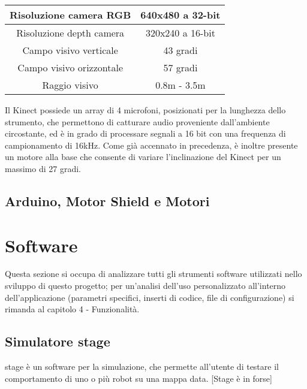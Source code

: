 \documentclass[Lau]{sapthesis}
\begin{document}
\begin{center}
\begin{tabular}{|c|c|}
  \hline
  Risoluzione camera RGB & 640x480 a 32-bit \\ \hline
  Risoluzione depth camera & 320x240 a 16-bit \\ \hline
  Campo visivo verticale & 43 gradi \\ \hline
  Campo visivo orizzontale & 57 gradi \\ \hline
  Raggio visivo & 0.8m - 3.5m \\ \hline
\end{tabular}
\end{center}
Il Kinect possiede un array di 4 microfoni, posizionati per la lunghezza dello strumento, che permettono di catturare audio proveniente dall'ambiente circostante, ed è in grado di processare segnali a 16 bit con una frequenza di campionamento di 16kHz.
Come già accennato in precedenza, è inoltre presente un motore alla base che consente di variare l'inclinazione del Kinect per un massimo di 27 gradi.
\subsection{Arduino, Motor Shield e Motori}
\section{Software}
Questa sezione si occupa di analizzare tutti gli strumenti software utilizzati nello sviluppo di questo progetto; per un'analisi dell'uso personalizzato all'interno dell'applicazione (parametri specifici, inserti di codice, file di configurazione) si rimanda al capitolo 4 - Funzionalità.\subsection{Simulatore stage}
stage è un software per la simulazione, che permette all'utente di testare il comportamento di uno o più robot su una mappa data. [Stage è in forse]
\end{document}

